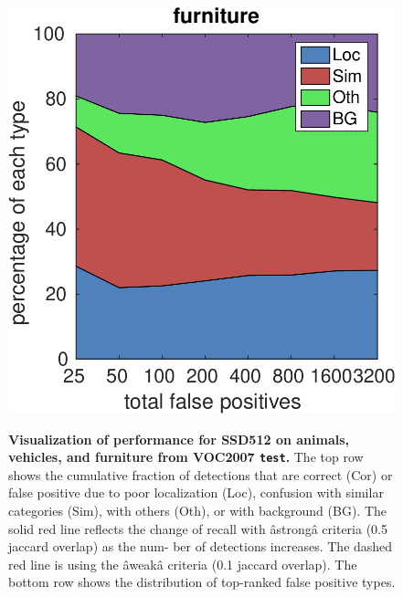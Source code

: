 \documentclass[runningheads]{llncs}
\begin{document}
\begin{figure}[tbp]
    \hspace{0.4cm}
    \includegraphics[width=0.285\linewidth]{figure/plots_fp_trendarea_furniture}\\
    \caption{\textbf{Visualization of performance for SSD512 on animals, vehicles, and furniture from VOC2007 \texttt{test}.} The top row shows the cumulative fraction of detections that are correct (Cor) or false positive due to poor localization (Loc), confusion with similar categories (Sim), with others (Oth), or with background (BG). The solid red line reflects the change of recall with âstrongâ criteria (0.5 jaccard overlap) as the num- ber of detections increases. The dashed red line is using the âweakâ criteria (0.1 jaccard overlap). The bottom row shows the distribution of top-ranked false positive types.}
    \label{fig:fpanalysis}
\end{figure}
\end{document}
